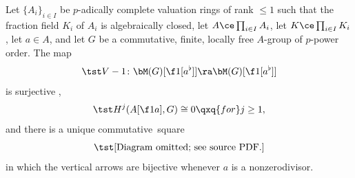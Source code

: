 \bprop \label{M(G)-local-analysis}
Let $\{A_i\}_{i \in I}$ be $p$-adically complete valuation rings  %
of rank $\le 1$ such that  the fraction field $K_i$ of $A_i$ is algebraically closed, let $A \ce \prod_{i \in I} A_i$, let $K \ce \prod_{i \in I} K_i$, let $a \in A$, and let $G$ be a commutative, finite, locally free $A$-group of $p$-power order. The map
\[
\tst V - 1 \colon \bM(G)[\f 1{[a^\flat]}] \ra \bM(G)[\f 1{[a^\flat]}]
\]
is surjective ,
\begin{equation*}
\tst H^j(A[\f 1a], G) \cong 0 \qxq{for} j \ge 1,
\end{equation*}
and there is a unique commutative~square
\[%
\source{purity-flat-cohomology}
\tst \text{[Diagram omitted; see source PDF.]}
\]%
in which the vertical arrows are bijective whenever $a$ is a nonzerodivisor.
\eprop


